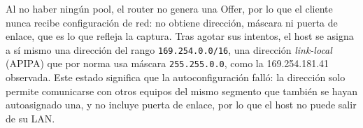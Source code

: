 Al no haber ningún pool, el router no genera una Offer, por lo que el cliente nunca recibe configuración de red: no obtiene dirección, máscara ni puerta de enlace, que es lo que refleja la captura. Tras agotar sus intentos, el host se asigna a sí mismo una dirección del rango \texttt{169.254.0.0/16}, una dirección \textit{link-local} (APIPA) que por norma usa máscara \texttt{255.255.0.0}, como la 169.254.181.41 observada. Este estado significa que la autoconfiguración falló: la dirección solo permite comunicarse con otros equipos del mismo segmento que también se hayan autoasignado una, y no incluye puerta de enlace, por lo que el host no puede salir de su LAN.

